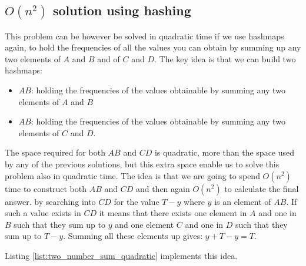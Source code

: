 \subsection{$O(n^2)$ solution using hashing}
This problem can be however be solved in quadratic time if we use hashmaps again, to hold 
the frequencies of all the values you can obtain by summing up any two elements of $A$ and $B$ and of $C$ and $D$.
The key idea is that we can build two hashmaps:
\begin{itemize}
	\item $AB$: holding the frequencies of the values obtainable by summing any two elements of $A$ and $B$
	\item $AB$: holding the frequencies of the values obtainable by summing any two elements of $C$ and $D$.
\end{itemize}
The space required for both $AB$ and $CD$ is quadratic, more than the space used by any of the previous solutions, but this extra space
enable us to solve this problem also in quadratic time. 
The idea is that we are going to spend $O(n^2)$ time to construct both $AB$ and $CD$
and then again  $O(n^2)$ to calculate the final answer. 
by searching into $CD$ for the value $T-y$ where $y$ is an element of $AB$. If such a value exists in $CD$ it means that there exists one element in  $A$ and one in $B$ such that they sum up to $y$ and
one element $C$ and one in $D$ such that they sum up to $T-y$. Summing all these elements up gives: $y+T-y = T$.

Listing \ref{list:two_number_sum_quadratic} implements this idea.




